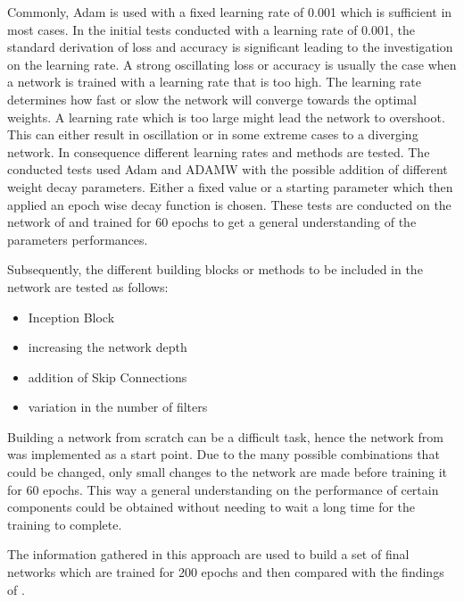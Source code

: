 \documentclass[
a4paper, 
12pt,
grayscalebody, %
abstract=on,
twoside, BCOR10mm, 12pt, DIV13,headinclude, footexclude, final, abstracton, openright
]{ibireprt}
\numberwithin{equation}{chapter}
\numberwithin{table}{chapter}
\numberwithin{figure}{chapter}
\numberwithin{algorithm}{chapter}
\numberwithin{example}{chapter}
\numberwithin{example}{chapter}
\begin{document}
Commonly, Adam is used with a fixed learning rate of 0.001 which is sufficient in most cases. In the initial tests conducted with a learning rate of 0.001, the standard derivation of loss and accuracy is significant leading to the investigation on the learning rate. A strong oscillating loss or accuracy is usually the case when a network is trained with a learning rate that is too high. The learning rate determines how fast or slow the network will converge towards the optimal weights. A learning rate which is too large might lead the network to overshoot. This can either result in oscillation or in some extreme cases to a diverging network. In consequence different learning rates and methods are tested. The conducted tests used Adam and ADAMW with the possible addition of different weight decay parameters. Either a fixed value or a starting parameter which then applied an epoch wise decay function is chosen. These tests are conducted on the network of \cite{Walle2023} and trained for 60 epochs to get a general understanding of the parameters performances.



Subsequently, the different building blocks or methods to be included in the network are tested as follows:

\begin{itemize}
	\item Inception Block 
	\item increasing the network depth
	\item addition of Skip Connections
	\item variation in the number of filters
\end{itemize}

Building a network from scratch can be a difficult task, hence the network from \cite{Walle2023} was implemented as a start point. Due to the many possible combinations that could be changed, only small changes to the network are made before training it for 60 epochs. This way a general understanding on the performance of certain components could be obtained without needing to wait a long time for the training to complete. 

The information gathered in this approach are used to build a set of final networks which are trained for 200 epochs and then compared with the findings of \cite{Walle2023}.


\end{document}
